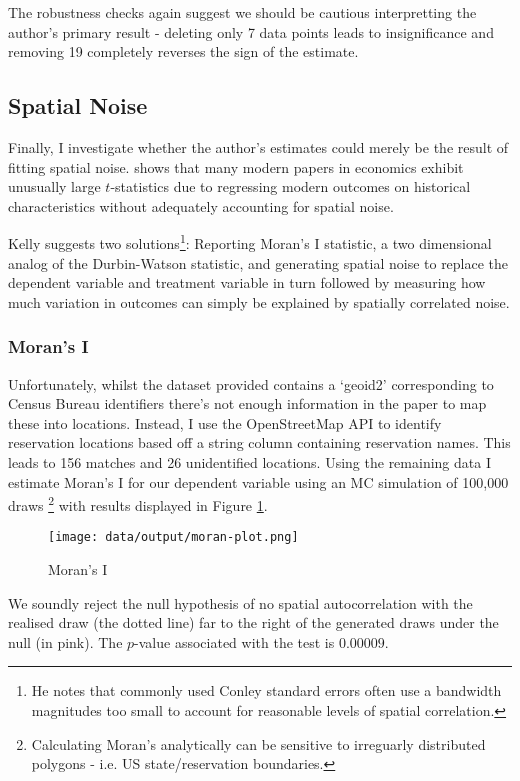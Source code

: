 \documentclass{article}
\begin{document}
The robustness checks again suggest we should be cautious interpretting the author's primary result - deleting only 7 data points leads to insignificance and 
removing 19 completely reverses the sign of the estimate.

\subsection*{Spatial Noise}
Finally, I investigate whether the author's estimates could merely be the result of fitting spatial noise. \cite{persistence} shows that many modern 
papers in economics exhibit unusually large $t$-statistics due to regressing modern outcomes on historical characteristics without adequately accounting for 
spatial noise. 

Kelly suggests two solutions\footnote{He notes that commonly used Conley standard errors often use a bandwidth magnitudes too small to account for reasonable levels of spatial correlation.}: Reporting Moran's I statistic, a two dimensional analog of the Durbin-Watson statistic,
 and  generating spatial noise to replace the dependent variable and treatment variable in turn followed by measuring how much variation in outcomes can simply be explained by spatially correlated noise.

\subsubsection*{Moran's I}
Unfortunately, whilst the dataset provided contains a `geoid2' corresponding to Census Bureau identifiers there's not enough information in the paper to map these 
into locations. Instead, I use the OpenStreetMap API \citep{OpenStreetMap} to identify reservation locations based off a string column containing reservation names. This leads 
to 156 matches and  26 unidentified locations. Using the remaining data I estimate Moran's I for our dependent variable using an MC simulation of 100,000 draws \footnote{Calculating Moran's analytically can be sensitive to irreguarly distributed polygons - i.e. US state/reservation boundaries.}
with  results displayed in Figure \ref{moran}.
\begin{figure}[htbp]
    \centering
    \texttt{[image: data/output/moran-plot.png]}
    \caption{Moran's I}
    \label{moran}
\end{figure}

We soundly reject the null hypothesis of no spatial autocorrelation with the realised draw (the dotted line) far to the right of 
the generated draws under the null (in pink). The $p$-value associated with the test is $0.00009$.
\end{document}

